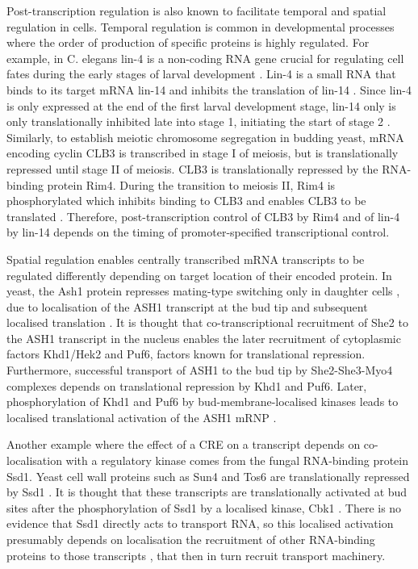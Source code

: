 \documentclass[../main.tex]{subfiles}
\begin{document}
Post-transcription regulation is also known to facilitate temporal and spatial regulation in cells.  
Temporal regulation is common in developmental processes where the order of production of specific proteins is highly regulated. 
For example, in C. elegans lin-4 is a non-coding RNA gene crucial for regulating cell fates during the early stages of larval development \parencite{Wightman1993}. 
Lin-4 is a small RNA that binds to its target mRNA lin-14 and inhibits the translation of lin-14 \parencite{Lee1993}.
Since lin-4 is only expressed at the end of the first larval development stage, lin-14 only is only translationally inhibited late into stage 1, initiating the start of stage 2 \parencite{Olsen1999}. 
Similarly, to establish meiotic chromosome segregation in budding yeast, mRNA encoding cyclin CLB3 is transcribed in stage I of meiosis, but is translationally repressed until stage II of meiosis. 
CLB3 is translationally repressed by the RNA-binding protein Rim4. 
During the transition to meiosis II, Rim4 is phosphorylated which inhibits binding to CLB3 and enables CLB3 to be translated \parencite{Berchowitz2013}. 
Therefore, post-transcription control of CLB3 by Rim4 and of lin-4 by lin-14 depends on the timing of promoter-specified transcriptional control.

Spatial regulation enables centrally transcribed mRNA transcripts to be regulated differently depending on target location of their encoded protein.
In yeast, the Ash1 protein represses mating-type switching only in daughter
cells \parencite{Sil1996}, due to localisation of the ASH1 transcript at the bud tip and subsequent localised translation \parencite{Niednery2014}. 
It is thought that co-transcriptional recruitment of She2 to the ASH1 transcript in the nucleus enables the later recruitment of cytoplasmic factors Khd1/Hek2 and Puf6, factors known for translational repression. 
Furthermore, successful transport of ASH1 to the bud tip by She2-She3-Myo4 complexes depends on translational repression by Khd1 and Puf6. 
Later, phosphorylation of Khd1 and Puf6 by bud-membrane-localised kinases leads to localised translational activation of the ASH1 mRNP \parencite{Paquin2007, Deng2008}.

Another example where the effect of a CRE on a transcript depends on co-localisation with a regulatory kinase comes from the fungal RNA-binding protein Ssd1. 
Yeast cell wall proteins such as Sun4 and Tos6 are translationally repressed by Ssd1 \parencite{Jansen2009}.
It is thought that these transcripts are translationally activated at bud sites after the phosphorylation of Ssd1 by a localised kinase, Cbk1 \parencite{Jansen2009}. 
There is no evidence that Ssd1 directly acts to transport RNA, so this localised activation presumably depends on localisation the recruitment of other RNA-binding proteins to those transcripts \parencite{Hogan2008, Bayne2021}, that then in turn recruit transport machinery.
\newpage
\end{document}
